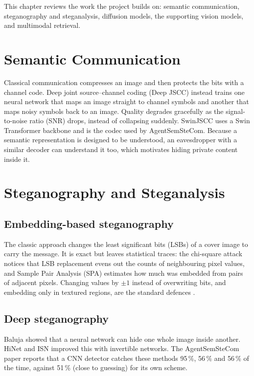 This chapter reviews the work the project builds on: semantic communication, steganography
and steganalysis, diffusion models, the supporting vision models, and multimodal retrieval.

\section{Semantic Communication}
Classical communication compresses an image and then protects the bits with a channel code.
Deep joint source--channel coding (Deep JSCC) \cite{bourtsoulatze2019deepjscc} instead trains one
neural network that maps an image straight to channel symbols and another that maps noisy
symbols back to an image. Quality degrades gracefully as the signal-to-noise ratio (SNR) drops,
instead of collapsing suddenly. SwinJSCC \cite{yang2024swinjscc} uses a Swin Transformer
backbone and is the codec used by AgentSemSteCom. Because a semantic representation is designed
to be understood, an eavesdropper with a similar decoder can understand it too, which motivates
hiding private content inside it.

\section{Steganography and Steganalysis}
\subsection{Embedding-based steganography}
The classic approach changes the least significant bits (LSBs) of a cover image to carry the
message. It is exact but leaves statistical traces: the chi-square attack
\cite{westfeld1999attacks} notices that LSB replacement evens out the counts of neighbouring
pixel values, and Sample Pair Analysis (SPA) \cite{dumitrescu2003spa} estimates how much was
embedded from pairs of adjacent pixels. Changing values by $\pm1$ instead of overwriting bits,
and embedding only in textured regions, are the standard defences
\cite{fridrich2009steganography}.

\subsection{Deep steganography}
Baluja \cite{baluja2017hiding} showed that a neural network can hide one whole image inside
another. HiNet \cite{jing2021hinet} and ISN \cite{lu2021isn} improved this with invertible
networks. The AgentSemSteCom paper reports that a CNN detector catches these methods 95\,\%,
56\,\% and 56\,\% of the time, against 51\,\% (close to guessing) for its own scheme.


